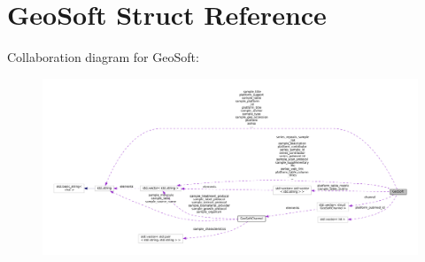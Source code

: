 \hypertarget{structGeoSoft}{}\section{Geo\+Soft Struct Reference}
\label{structGeoSoft}


Collaboration diagram for Geo\+Soft\+:\nopagebreak
\begin{figure}[H]
\begin{center}
\leavevmode
\includegraphics[width=350pt]{structGeoSoft__coll__graph}
\end{center}
\end{figure}

